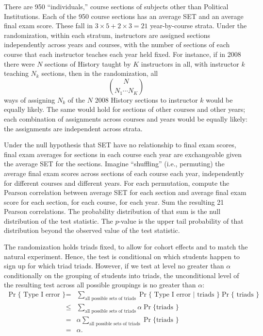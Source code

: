 \documentclass[12pt]{article}
\newcommand{\beq}{\begin{equation}}
\newcommand{\eeq}{\end{equation}}
\begin{document}
There are 950 ``individuals,'' course sections of subjects other
than Political Institutions.
Each of the 950 course sections has an average SET and an average final exam score.
These fall in $3\times5 + 2 \times 3 = 21$ year-by-course strata.
Under the randomization, within each stratum, instructors
are assigned sections independently across years and courses, with
the number of sections of each course that each instructor teaches each year held fixed.
For instance, if in 2008 there were $N$ sections of History taught by $K$ instructors in all,
with instructor $k$ teaching $N_k$ sections, then in the randomization,
all
\beq
    {N}\choose{N_1 \cdots N_K}
\eeq
ways of assigning $N_k$ of the $N$ 2008 History sections to instructor $k$ 
would be equally likely.
The same would hold for sections of other courses and other years;
each combination of assignments across courses and years would be equally likely:
the assignments are independent across strata.

Under the null hypothesis that SET have no relationship to final exam scores,
final exam averages for sections in each course each year are exchangeable given the average SET
for the sections.
Imagine ``shuffling'' (i.e., permuting)
the average final exam scores across sections of each course
each year, independently
for different courses and different years.
For each permutation, compute the Pearson correlation between average SET for each section
and average final exam score for each section, for each course, for each year.
Sum the resulting 21 Pearson correlations.
The probability distribution of that sum is the null distribution of the test statistic.
The $p$-value is the upper tail probability of that distribution beyond the observed value of the 
test statistic.

The randomization holds triads fixed, to allow for cohort effects
and to match the natural experiment.
Hence, the test is conditional on which students happen to sign up for which triad triads.
However, if we test at level no greater than $\alpha$ conditionally 
on the grouping of students into triads, 
the unconditional level of the resulting test across all possible groupings is no 
greater than $\alpha$:
\begin{eqnarray}
   \Pr \{ \mbox{ Type I error } \} &=& \sum_{\mbox{all possible sets of triads}} \Pr \{ \mbox{ Type I error } | 
   \mbox{ triads } \} \Pr\{\mbox{ triads } \} \nonumber \\
   &\le& 
    \sum_{\mbox{all possible sets of triads}} \alpha \Pr\{\mbox{triads } \} \nonumber \\
    &=& \alpha \sum_{\mbox{all possible sets of triads}} \Pr\{\mbox{triads } \} \nonumber \\
    &=& \alpha.
\end{eqnarray}
\end{document}
